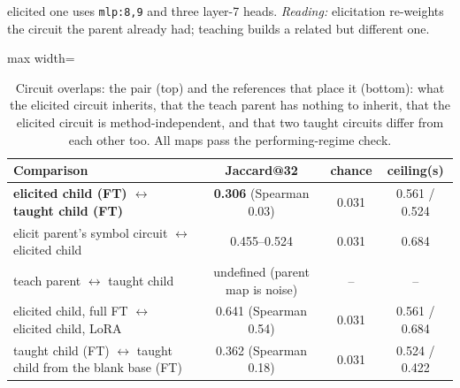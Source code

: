 \documentclass[11pt]{article}
\begin{document}
\begin{enumerate}[label=\textbf{M\arabic*}, leftmargin=*, itemsep=1.2em, resume]
{elicited one uses \texttt{mlp:8,9} and three layer-7 heads. \emph{Reading:} elicitation
re-weights the circuit the parent already had; teaching builds a related but different one.}
\begin{table}[h]\centering\small
\begin{adjustbox}{max width=\textwidth}
\begin{tabular}{lccc}
\toprule
Comparison & Jaccard@32 & chance & ceiling(s) \\
\midrule
\textbf{elicited child (FT) $\leftrightarrow$ taught child (FT)} & \textbf{0.306} (Spearman 0.03) & 0.031 & 0.561 / 0.524 \\
\midrule
elicit parent's symbol circuit $\leftrightarrow$ elicited child & 0.455--0.524 & 0.031 & 0.684 \\
teach parent $\leftrightarrow$ taught child & undefined (parent map is noise) & -- & -- \\
elicited child, full FT $\leftrightarrow$ elicited child, LoRA & 0.641 (Spearman 0.54) & 0.031 & 0.561 / 0.684 \\
taught child (FT) $\leftrightarrow$ taught child from the blank base (FT) & 0.362 (Spearman 0.18) & 0.031 & 0.524 / 0.422 \\
\bottomrule
\end{tabular}
\end{adjustbox}
\caption{Circuit overlaps: the pair (top) and the references that place it (bottom): what the
elicited circuit inherits, that the teach parent has nothing to inherit, that the elicited
circuit is method-independent, and that two taught circuits differ from each other too. All maps
pass the performing-regime check.}
\label{tab:overlap}
\end{table}


\end{enumerate}
\end{document}
